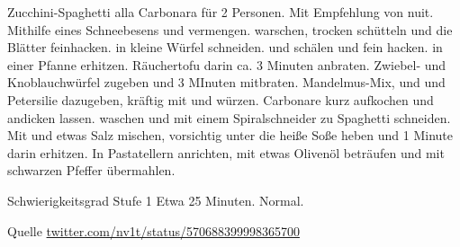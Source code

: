 \begin{recipe}{Zucchini-Spaghetti alla Carbonara für 2 Personen. Mit Empfehlung von nuit.}
	 Mithilfe eines Schneebesens und 
	 vermengen. 
	 warschen, trocken schütteln und die Blätter feinhacken.
	 in kleine Würfel schneiden. 
	 und 
	 schälen und fein hacken.
	 in einer Pfanne erhitzen. Räuchertofu darin ca. 3 Minuten anbraten. Zwiebel- und Knoblauchwürfel zugeben und 3 MInuten mitbraten. Mandelmus-Mix, 
	 und 
	 und Petersilie dazugeben, kräftig mit
	 und 
	 würzen. Carbonare kurz aufkochen und andicken lassen.
	 waschen und mit einem Spiralschneider zu Spaghetti schneiden. Mit 
	 und etwas Salz mischen, vorsichtig unter die heiße Soße heben und 1 Minute darin erhitzen. In Pastatellern anrichten, mit etwas Olivenöl beträufen und mit schwarzen Pfeffer übermahlen.
	\item{Schwierigkeitsgrad} Stufe 1
	\preparationtime Etwa 25 Minuten.
	\washingup Normal.
	\item{Quelle} \href{https://twitter.com/nv1t/status/570688399998365700/photo/1}{twitter.com/nv1t/status/570688399998365700}
\end{recipe}
